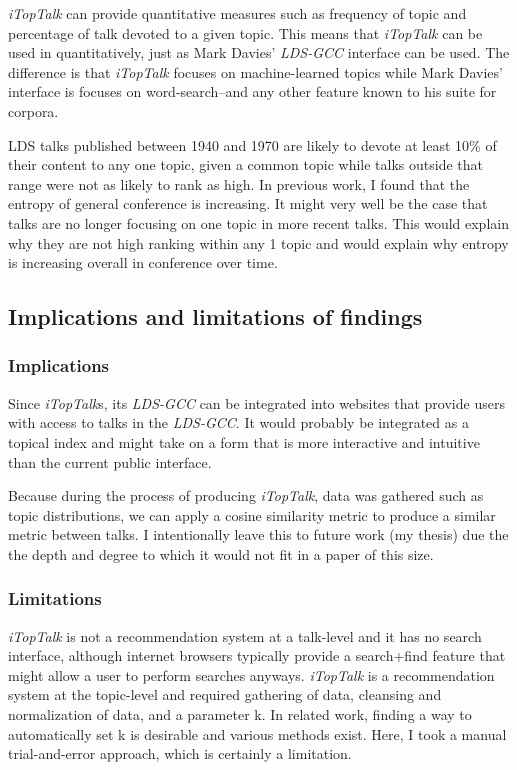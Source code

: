 \emph{iTopTalk} can provide quantitative measures such as frequency of topic and percentage of talk devoted to a given topic. This means that \emph{iTopTalk} can be used in quantitatively, just as Mark Davies' \emph{LDS-GCC} interface can be used. The difference is that \emph{iTopTalk} focuses on machine-learned topics while Mark Davies' interface is focuses on word-search--and any other feature known to his suite for corpora.

LDS talks published between 1940 and 1970 are likely to devote at least 10\% of their content to any one topic, given a common topic while talks outside that range were not as likely to rank as high. In previous work, I found that the entropy of general conference is increasing. It might very well be the case that talks are no longer focusing on one topic in more recent talks. This would explain why they are not high ranking within any 1 topic and would explain why entropy is increasing overall in conference over time. 

\subsection{Implications and limitations of findings}
\subsubsection{Implications}
Since \emph{iTopTalk}s, its \emph{LDS-GCC} can be integrated into websites that provide users with access to talks in the \emph{LDS-GCC}. It would probably be integrated as a topical index and might take on a form that is more interactive and intuitive than the current public interface. 

Because during the process of producing \emph{iTopTalk}, data was gathered such as topic distributions, we can apply a cosine similarity metric to produce a similar metric between talks. I intentionally leave this to future work (my thesis) due the the depth and degree to which it would not fit in a paper of this size.

\subsubsection{Limitations}
\emph{iTopTalk} is not a recommendation system at a talk-level and it has no search interface, although internet browsers typically provide a search+find feature that might allow a user to perform searches anyways. \emph{iTopTalk} is a recommendation system at the topic-level and required gathering of data, cleansing and normalization of data, and a parameter k. In related work, finding a way to automatically set k is desirable and various methods exist. Here, I took a manual trial-and-error approach, which is certainly a limitation.

